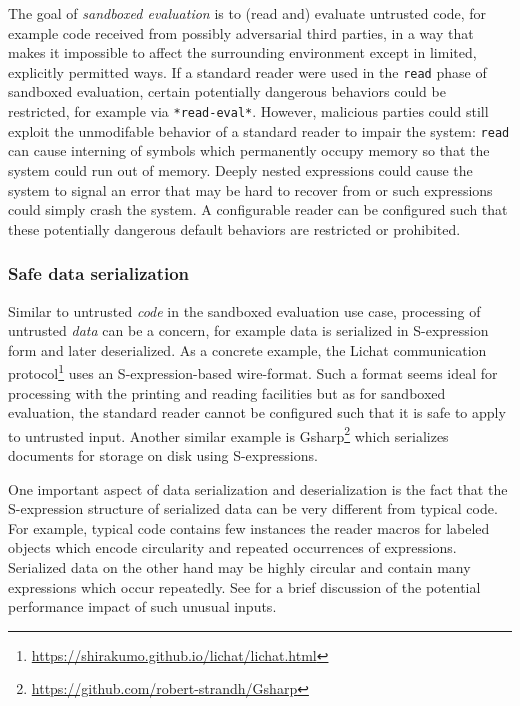 The goal of \emph{sandboxed evaluation} is to (read and) evaluate
untrusted code, for example code received from possibly adversarial
third parties, in a way that makes it impossible to affect the
surrounding environment except in limited, explicitly permitted ways.
If a standard \cl{} reader were used in the \texttt{read} phase of
sandboxed evaluation, certain potentially dangerous behaviors could be
restricted, for example via \texttt{*read-eval*}.  However, malicious
parties could still exploit the unmodifable behavior of a standard
reader to impair the system: \texttt{read} can cause interning of
symbols which permanently occupy memory so that the system could run
out of memory.
%
%
Deeply nested expressions could cause the system to signal an
error that may be hard to recover from or such expressions could
simply crash the system.  A configurable reader can be configured such
that these potentially dangerous default behaviors are restricted or
prohibited.

\subsubsection{Safe data serialization}
\label{sec:serialization}

Similar to untrusted \emph{code} in the sandboxed evaluation use case,
processing of untrusted \emph{data} can be a concern, for example data
is serialized in S-expression form and later deserialized.  As a
concrete example, the Lichat communication
protocol\footnote{\url{https://shirakumo.github.io/lichat/lichat.html}}
uses an S-expression-based wire-format.  Such a format seems ideal for
processing with the \cl{} printing and reading facilities but as for
sandboxed evaluation, the standard \cl{} reader cannot be configured
such that it is safe to apply to untrusted input.  Another similar
example is
Gsharp\footnote{\url{https://github.com/robert-strandh/Gsharp}} which
serializes documents for storage on disk using S-expressions.

One important aspect of data serialization and deserialization is the
fact that the S-expression structure of serialized data can be very
different from typical code.  For example, typical code contains few
instances the reader macros for labeled objects which encode
circularity and repeated occurrences of expressions.  Serialized data
on the other hand may be highly circular and contain many expressions
which occur repeatedly.  See  for a
brief discussion of the potential performance impact of such unusual
inputs.

